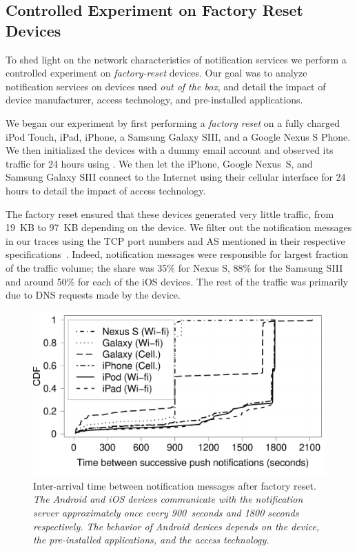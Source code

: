\subsection{Controlled Experiment on Factory Reset Devices}

To shed light on the network characteristics of notification services we perform a controlled experiment on \emph{factory-reset} devices. 
Our goal was to analyze notification services on devices used \emph{out of the box}, and detail the impact of device manufacturer, access technology, and pre-installed applications. 

We began our experiment by first performing a \emph{factory reset} on a fully charged iPod Touch, iPad, iPhone, a Samsung Galaxy SIII, and a Google Nexus S Phone.
We then initialized the devices with a dummy email account and observed its \wifi traffic for 24 hours using \platname.
We then let the iPhone, Google Nexus~S, and Samsung Galaxy SIII connect to the Internet using their cellular interface for 24 hours to detail the impact of access technology.

The factory reset ensured that these devices generated very little traffic, from 19~KB to 97~KB depending on the device. 
We filter out the notification messages in our traces using the TCP port numbers and AS mentioned in their respective specifications~\cite{gcm, apns}.
Indeed, notification messages were responsible for largest fraction of the traffic volume; the share was 35\% for Nexus S, 88\% for the Samsung SIII and around 50\% for each of the iOS devices. 
The rest of the traffic was primarily due to DNS requests made by the device. 

\begin{figure}
\centering
\includegraphics[width=\columnwidth]{plots/push_factoryreset_interarrival_distrib.pdf}
\caption{Inter-arrival time between notification messages after factory reset. \emph{The Android and iOS devices communicate with the notification server approximately once every 900~seconds and 1800 seconds respectively. The behavior of Android devices depends on the device, the pre-installed applications, and the access technology.}}
\label{fig:push-expt-interarrival}
\end{figure}

